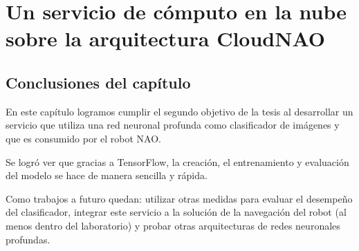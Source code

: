 \documentclass[letterpaper,12pt,spanish]{report}
\begin{document}
\chapter{Un servicio de cómputo en la nube sobre la arquitectura CloudNAO}
\label{\detokenize{chapter_three:un-servicio-de-computo-en-la-nube-sobre-la-arquitectura-cloudnao}}
\label{\detokenize{chapter_three::doc}}






\section*{Conclusiones del capítulo}
En este capítulo logramos cumplir
el segundo objetivo de la tesis
al desarrollar un servicio que
utiliza una red neuronal profunda
como clasificador de imágenes y
que es consumido por el robot NAO.

Se logró ver que gracias a
TensorFlow, la creación, el 
entrenamiento y evaluación
del modelo se hace de manera sencilla
y rápida.

Como trabajos a futuro quedan:
utilizar otras medidas para evaluar
el desempeño del clasificador,
integrar este servicio a la solución
de la navegación del robot 
(al menos dentro del laboratorio)
y probar otras arquitecturas
de redes neuronales profundas.













\printglossary[nonumberlist, toctitle=Glosario]
\nocite{*}



\end{document}

